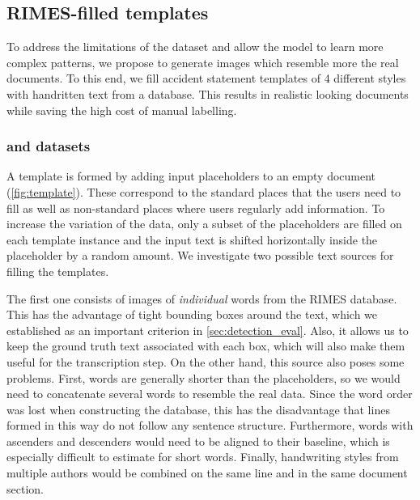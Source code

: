 
	\subsection{RIMES-filled templates}

			To address the limitations of the  dataset and allow the model to learn more complex patterns, we propose to generate images which resemble more the real documents. To this end, we fill accident statement templates of 4 different styles with handritten text from a database. This results in realistic looking documents while saving the high cost of manual labelling.


		\subsubsection*{ and  datasets}
			A template is formed by adding input placeholders to an empty document (\autoref{fig:template}). These correspond to the standard places that the users need to fill as well as non-standard places where users regularly add information. To increase the variation of the data, only a subset of the placeholders are filled on each template instance and the input text is shifted horizontally inside the placeholder by a random amount. We investigate two possible text sources for filling the templates.

			The first one consists of images of \emph{individual} words from the RIMES database. This has the advantage of tight bounding boxes around the text, which we established as an important criterion in \autoref{sec:detection_eval}. Also, it allows us to keep the ground truth text associated with each box, which will also make them useful for the transcription step. On the other hand, this source also poses some problems. First, words are generally shorter than the placeholders, so we would need to concatenate several words to resemble the real data. Since the word order was lost when constructing the database, this has the disadvantage that lines formed in this way do not follow any sentence structure. Furthermore, words with ascenders and descenders would need to be aligned to their baseline, which is especially difficult to estimate for short words. Finally, handwriting styles from multiple authors would be combined on the same line and in the same document section.

